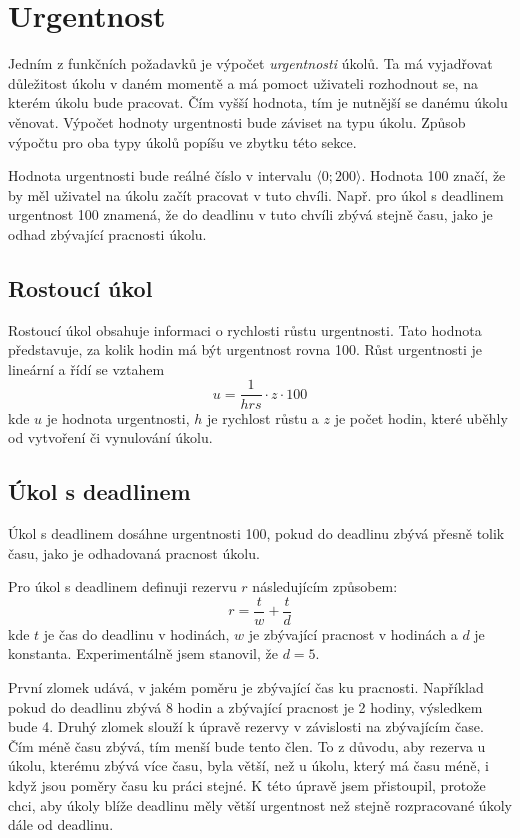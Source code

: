 \documentclass[thesis=B,czech]{FITthesis}[2012/06/26]
\begin{document}
			
	\section{Urgentnost}
		Jedním z funkčních požadavků je výpočet \textit{urgentnosti} úkolů. Ta má vyjadřovat důležitost úkolu v daném momentě a má pomoct uživateli rozhodnout se, na kterém úkolu bude pracovat. Čím vyšší hodnota, tím je nutnější se danému úkolu věnovat. Výpočet hodnoty urgentnosti bude záviset na typu úkolu. Způsob výpočtu pro oba typy úkolů popíšu ve zbytku této sekce.
		
		Hodnota urgentnosti bude reálné číslo v intervalu $\langle 0; 200 \rangle$. Hodnota 100 značí, že by měl uživatel na úkolu začít pracovat v tuto chvíli. Např. pro úkol s deadlinem urgentnost 100 znamená, že do deadlinu v tuto chvíli zbývá stejně času, jako je odhad zbývající pracnosti úkolu.
	
		\subsection{Rostoucí úkol}
			Rostoucí úkol obsahuje informaci o rychlosti růstu urgentnosti. Tato hodnota představuje, za kolik hodin má být urgentnost rovna 100. Růst urgentnosti je lineární a řídí se vztahem
			$$
				u = \frac{1}{hrs} \cdot z \cdot 100
			$$
			kde $u$ je hodnota urgentnosti, $h$ je rychlost růstu a $z$ je počet hodin, které uběhly od vytvoření či vynulování úkolu.
		
		
		\subsection{Úkol s deadlinem}
			Úkol s deadlinem dosáhne urgentnosti 100, pokud do deadlinu zbývá přesně tolik času, jako je odhadovaná pracnost úkolu.
		
			Pro úkol s deadlinem definuji rezervu $r$ následujícím způsobem:
			\begin{equation}
				r = \frac{t}{w} + \frac{t}{d}
			\end{equation}
			kde $t$ je čas do deadlinu v hodinách, $w$ je zbývající pracnost v hodinách a $d$ je konstanta. Experimentálně jsem stanovil, že $d=5$. 
			
			První zlomek udává, v jakém poměru je zbývající čas ku pracnosti. Například pokud do deadlinu zbývá 8 hodin a zbývající pracnost je 2 hodiny, výsledkem bude 4. Druhý zlomek slouží k úpravě rezervy v závislosti na zbývajícím čase. Čím méně času zbývá, tím menší bude tento člen. To z důvodu, aby rezerva u úkolu, kterému zbývá více času, byla větší, než u úkolu, který má času méně, i když jsou poměry času ku práci stejné. 
			K této úpravě jsem přistoupil, protože chci, aby úkoly blíže deadlinu měly větší urgentnost než stejně rozpracované úkoly dále od deadlinu.
			
\end{document}
